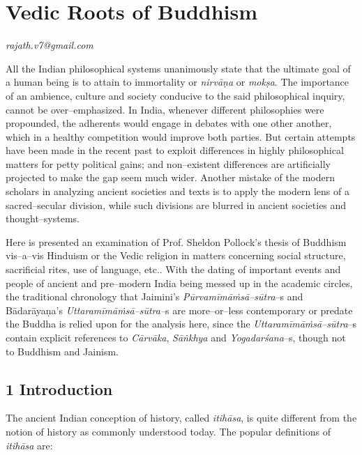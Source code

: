 
\chapter{Vedic Roots of Buddhism}\label{chapter5}


\begin{flushright}
\textit{rajath.v7@gmail.com}
\end{flushright}

All the Indian philosophical systems unanimously state that the ultimate goal of a human being is to attain to immortality or \textit{nirvāṇa} or \textit{mokṣa}. The importance of an ambience, culture and society conducive to the said philosophical inquiry, cannot be over–emphasized. In India, whenever different philosophies were propounded, the adherents would engage in debates with one other another, which in a healthy competition would improve both parties. But certain attempts have been made in the recent past to exploit differences in highly philosophical matters for petty political gains; and non–existent differences are artificially projected to make the gap seem much wider. Another mistake of the modern scholars in analyzing ancient societies and texts is to apply the modern lens of a sacred–secular division, while such divisions are blurred in ancient societies and thought–systems.

Here is presented an examination of Prof. Sheldon Pollock’s thesis of Buddhism vis–a–vis Hinduism or the Vedic religion in matters concerning social structure, sacrificial rites, use of language, etc.. With the dating of important events and people of ancient and pre–modern India being messed up in the academic circles, the traditional chronology that Jaimini’s \textit{Pūrvamīmāṁsā–sūtra}–s and Bādarāyaṇa’s \textit{Uttaramīmāṁsā–sūtra–}s are more–or–less contemporary or predate the Buddha is relied upon for the analysis here, since the \textit{Uttaramīmāṁsā–sūtra}–s contain explicit references to \textit{Cārvāka}, \textit{Sāṅkhya} and \textit{Yogadarśana}–s, though not to Buddhism and Jainism.

\section*{1 Introduction}

The ancient Indian conception of history, called \textit{itihāsa}, is quite different from the notion of history as commonly understood today. The popular definitions of \textit{itihāsa} are:

